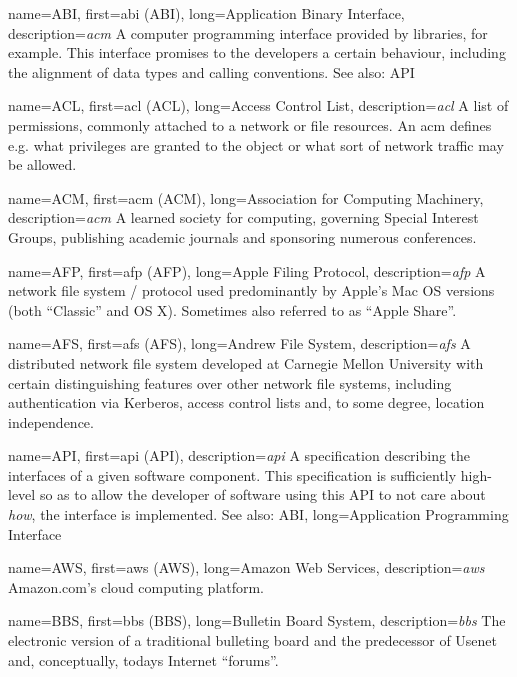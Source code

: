 {
	name={ABI},
	first={\acrlong{abi} (ABI)},
	long={Application Binary Interface},
	description={{\em \acrlong{acm}} A computer programming
interface provided by libraries, for example.  This interface promises to
the developers a certain behaviour, including the alignment of data types
and calling conventions.  See also: API}
}

{
	name={ACL},
	first={\acrlong{acl} (ACL)},
	long={Access Control List},
	description={{\em \acrlong{acl}}  A list of
permissions, commonly attached to a network or file resources.
An \acrshort{acm} defines e.g. what privileges are granted to
the object or what sort of network traffic may be
allowed.}
}

{
	name={ACM},
	first={\acrlong{acm} (ACM)},
	long={Association for Computing Machinery},
	description={{\em \acrlong{acm}}  A learned society for
computing, governing Special Interest Groups, publishing academic journals
and sponsoring numerous conferences.}
}

{
	name={AFP},
	first={\acrlong{afp} (AFP)},
	long={Apple Filing Protocol},
	description={{\em \acrlong{afp}}   A network file system / protocol
used predominantly by Apple's Mac OS versions (both ``Classic'' and OS X).
Sometimes also referred to as ``Apple Share''.}
}

{
	name={AFS},
	first={\acrlong{afs} (AFS)},
	long={Andrew File System},
	description={{\em \acrlong{afs}} A distributed network file system
developed at Carnegie Mellon University with certain distinguishing
features over other network file systems, including authentication via
Kerberos, access control lists and, to some degree,
location independence.}
}

{
	name={API},
	first={\acrlong{api} (API)},
	description={{\em \acrlong{api}} A specification
describing the interfaces of a given software component.  This
specification is sufficiently high-level so as to allow the developer of
software using this API to not care about {\em how},
the interface is implemented. See also: ABI},
	long={Application Programming Interface}
}

{
	name={AWS},
	first={\acrlong{aws} (AWS)},
	long={Amazon Web Services},
	description={{\em \acrlong{aws}} Amazon.com's cloud computing
platform.}
}

{
	name={BBS},
	first={\acrlong{bbs} (BBS)},
	long={Bulletin Board System},
	description={{\em \acrlong{bbs}} The electronic version of a
traditional bulleting board and the predecessor of Usenet and,
conceptually, todays Internet ``forums''.}
}

